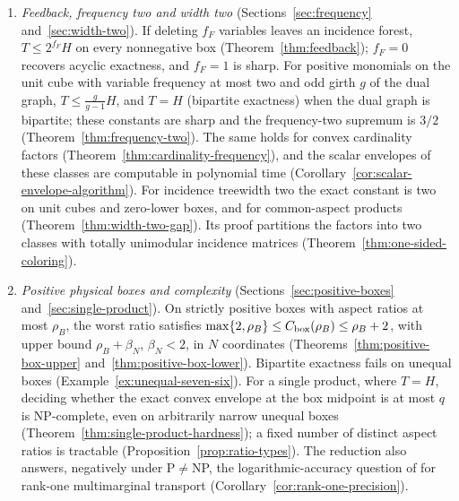 \documentclass[11pt]{article}
\begin{document}
\begin{enumerate}
(Section~\ref{sec:incidence}). On the unit cube, an incidence orientation
with variable outdegree $r$ and factor outdegree $s$ gives
$T\le[r+\min\{s,R_{s+1}\}+\kappa]H$ with $\kappa=2/(1-e^{-1})$
(Theorem~\ref{thm:incidence-orientation}); the worst ratios under
incidence treewidth, degeneracy, or orientation parameter $k$ are all
asymptotic to $k$ (Corollary~\ref{cor:structural-growth}). A lower bound
$\delta$ on all normalized means gives growth
$\log(1/\delta)/\log\log(1/\delta)$ (Theorem~\ref{thm:marginal-floor}).
\item \emph{Feedback, frequency two and width two}
(Sections~\ref{sec:frequency} and~\ref{sec:width-two}). If deleting $f_F$
variables leaves an incidence forest, $T\le2^{f_F}H$ on every nonnegative
box (Theorem~\ref{thm:feedback}); $f_F=0$ recovers acyclic exactness, and
$f_F=1$ is sharp. For positive monomials on the unit cube with variable
frequency at most two and odd girth $g$ of the dual graph,
$T\le\frac{g}{g-1}H$, and $T=H$ (bipartite exactness) when the dual graph
is bipartite; these constants are sharp and the frequency-two supremum is
$3/2$ (Theorem~\ref{thm:frequency-two}). The same holds for convex
cardinality factors (Theorem~\ref{thm:cardinality-frequency}), and the
scalar envelopes of these classes are computable in polynomial time
(Corollary~\ref{cor:scalar-envelope-algorithm}). For incidence treewidth
two the exact constant is two on unit cubes and zero-lower boxes, and for
common-aspect products (Theorem~\ref{thm:width-two-gap}). Its proof
partitions the factors into two classes with totally unimodular incidence
matrices (Theorem~\ref{thm:one-sided-coloring}).
\item \emph{Positive physical boxes and complexity}
(Sections~\ref{sec:positive-boxes} and~\ref{sec:single-product}). On
strictly positive boxes with aspect ratios at most $\rho_B$, the worst
ratio satisfies $\max\{2,\rho_B\}\le C_{\rm box}(\rho_B)\le\rho_B+2$, with
upper bound $\rho_B+\beta_N$, $\beta_N<2$, in $N$ coordinates
(Theorems~\ref{thm:positive-box-upper} and~\ref{thm:positive-box-lower}).
Bipartite exactness fails on unequal boxes
(Example~\ref{ex:unequal-seven-six}). For a single product, where $T=H$,
deciding whether the exact convex envelope at the box midpoint is at most
$q$ is NP-complete, even on arbitrarily narrow unequal boxes
(Theorem~\ref{thm:single-product-hardness}); a fixed number of distinct
aspect ratios is tractable (Proposition~\ref{prop:ratio-types}). The
reduction also answers, negatively under P${}\ne{}$NP, the
logarithmic-accuracy question of \citet{AltschulerBoixAdsera2023} for
rank-one multimarginal transport (Corollary~\ref{cor:rank-one-precision}).
\end{enumerate}
\end{document}
